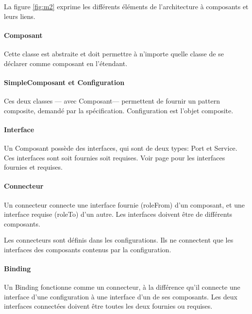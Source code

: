 \documentclass[a4paper, titlepage]{article}
\begin{document}
		
			La figure \ref{fig:m2} exprime les différents éléments de l'architecture à
			composants et leurs liens.
		
			\paragraph{Composant}
			
				Cette classe est abstraite et doit permettre à n'importe quelle
				classe de se déclarer comme composant en l'étendant.
				
			\paragraph{SimpleComposant et Configuration}
			
				Ces deux classes --- avec Composant--- permettent de fournir un
				pattern composite, demandé par la spécification. Configuration
				est l'objet composite.
			
			\paragraph{Interface}
			
				Un Composant possède des interfaces, qui sont de deux types: Port et
				Service. Ces interfaces sont soit fournies soit requises. Voir page
				\pageref{def:reqfour} pour les interfaces fournies et requises.
				
				
			\paragraph{Connecteur}
			
				Un connecteur connecte une interface fournie (roleFrom) d'un
				composant, et une interface requise (roleTo) d'un autre. Les
				interfaces doivent être de différents composants.
				
				Les connecteurs sont définis dans les configurations. Ils ne
				connectent que les interfaces des composants contenus par la
				configuration.
				
			\paragraph{Binding}
			
				Un Binding fonctionne comme un connecteur, à la différence qu'il
				connecte une interface d'une configuration à une interface d'un de
				ses composants. Les deux interfaces connectées doivent être toutes
				les deux fournies ou requises.
				
\end{document}
